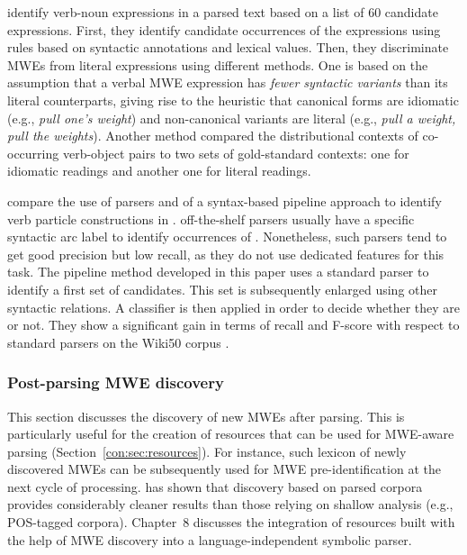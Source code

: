 \documentclass[output=paper]{langsci/langscibook}
\begin{document}
\citet{fazly-cook-stevenson:2009:cl} identify verb-noun expressions in a parsed text based on a list of 60 candidate expressions. First, they identify candidate occurrences of the expressions using rules based on syntactic annotations and lexical values. Then, they discriminate  MWEs from literal expressions using different methods. One is based on the assumption that a verbal MWE expression has \emph{fewer syntactic variants} than its literal counterparts, giving rise to the heuristic that canonical forms are idiomatic (e.g., \textit{pull one's weight}) and non-canonical variants are literal (e.g., \textit{pull a weight, pull the weights}). Another method
compared the distributional contexts of co-occurring verb-object pairs to two sets of gold-standard contexts: one for idiomatic readings and another one for literal readings. 

\citet{nagyt-vincze:2014:mwe} compare the use of parsers and of a syntax-based pipeline approach to identify verb particle constructions in .  off-the-shelf parsers usually have a specific syntactic arc label to identify occurrences of . Nonetheless, such parsers tend to get good precision but low recall, as they do not use dedicated features for this task. The pipeline method developed in this paper  uses a standard parser to identify a first set of candidates. This set is subsequently enlarged using other syntactic relations. A classifier is then applied in order to decide whether they are  or not. They show a significant gain in terms of recall and F-score with respect to standard parsers on the Wiki50 corpus \citep{vincze11}.

\subsubsection{Post-parsing MWE discovery}
\label{con:ssec:discopost}
This section discusses the discovery of new MWEs after parsing. This is particularly useful for the creation of resources that can be used for MWE-aware parsing (Section~\ref{con:sec:resources}). 
For instance, such lexicon of newly discovered MWEs can be subsequently used for MWE pre-identification at the next cycle of processing.
\citet{seretan11} has shown that discovery based on parsed corpora provides considerably cleaner {results than those relying on shallow analysis (e.g., POS-tagged corpora)}. Chapter~8 discusses the integration of resources built with the help of MWE discovery into a language-independent symbolic parser.
\end{document}
